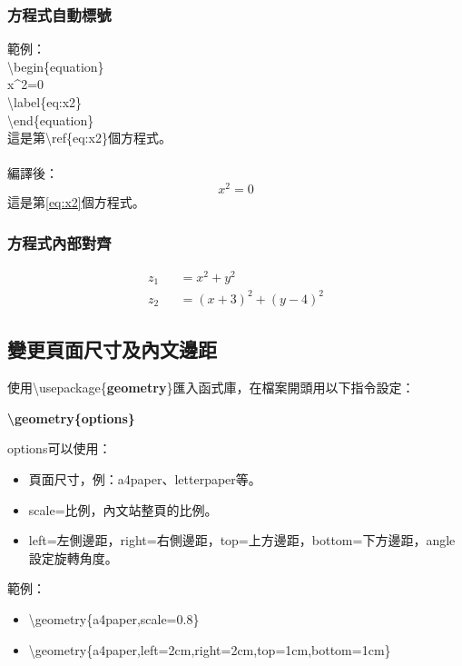 \documentclass[12pt]{article}
\begin{document}
\begin{CJK*}{UTF8}{bsmi}
			\subsubsection{方程式自動標號}
				範例： \\
				\hspace*{2pc}\textbackslash begin\{equation\} \\
				\hspace*{4pc}x\string^2=0 \\
				\hspace*{4pc}\textbackslash label\{eq:x2\} \\
				\hspace*{2pc}\textbackslash end\{equation\} \\
				這是第\textbackslash ref\{eq:x2\}個方程式。\\ \\
				編譯後： \\
				\begin{equation}
					x^2=0
					\label{eq:x2}
				\end{equation}
				這是第\ref{eq:x2}個方程式。
				
			\subsubsection{方程式內部對齊}
				\begin{eqnarray}
					z_1&&=x^2+y^2 \\
					z_2&&=(x+3)^2+(y-4)^2
				\end{eqnarray}
			\newpage
			\subsection{變更頁面尺寸及內文邊距}
				使用\textbackslash usepackage\{\textbf{geometry}\}匯入函式庫，在檔案開頭用以下指令設定：
				\begin{center}
					\textbf{\textbackslash geometry\{options\}}
				\end{center}
				options可以使用：
				\begin{itemize}
					\item 頁面尺寸，例：a4paper、letterpaper等。
					\item scale=比例，內文站整頁的比例。
					\item left=左側邊距，right=右側邊距，top=上方邊距，bottom=下方邊距，angle設定旋轉角度。
				\end{itemize}
				範例： \\
				\begin{itemize}
					\item \textbackslash geometry\{a4paper,scale=0.8\}
					\item \textbackslash geometry\{a4paper,left=2cm,right=2cm,top=1cm,bottom=1cm\}
				\end{itemize}

\end{CJK*}
\end{document}
